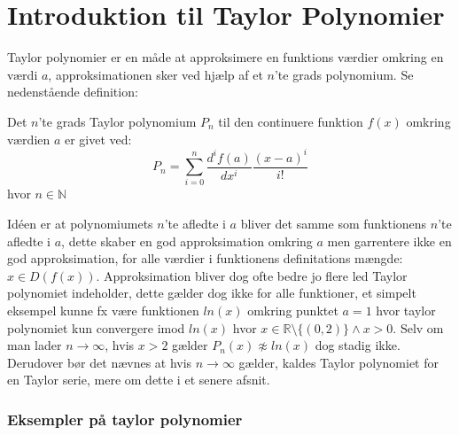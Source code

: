 \chapter{Introduktion til Taylor Polynomier}
\label{ch:ItTP}
Taylor polynomier er en måde at approksimere en funktions værdier omkring en værdi $a$, 
approksimationen sker ved hjælp af et $n$'te grads polynomium. Se nedenstående definition: 
\begin{defn}
    Det $n$'te grads Taylor polynomium $P_n$ til den continuere funktion $f(x)$ omkring værdien $a$ er givet ved:
    \[
    P_n = \sum^{n}_{i=0} \frac{d^i f(a)}{dx^i} \frac{(x-a)^{i}}{i!}
    \]
    hvor $n \in \mathbb{N}$
\end{defn}
\label{def:taylorPolynomium}
Idéen er at polynomiumets $n$'te afledte i $a$ bliver det samme som funktionens $n$'te afledte i $a$, 
dette skaber en god approksimation omkring $a$ men garrentere ikke en god approksimation, 
for alle værdier i funktionens definitations mængde: $x \in D(f(x))$. Approksimation bliver dog ofte bedre jo flere led
Taylor polynomiet indeholder, dette gælder dog ikke for alle funktioner, et simpelt eksempel kunne fx være funktionen $ln(x)$
omkring punktet $a=1$ hvor taylor polynomiet kun convergere imod $ln(x)$ hvor $x \in \mathbb{R} \setminus\{(0, 2)\} \land x > 0$. 
Selv om man lader $n \rightarrow \infty$, hvis $x > 2$ gælder $P_n(x) \not \approx ln(x)$ dog stadig ikke.
Derudover bør det nævnes at hvis $n \rightarrow \infty$ gælder, kaldes Taylor polynomiet for en Taylor serie, mere om dette i et senere afsnit. %
\subsection*{Eksempler på taylor polynomier}

